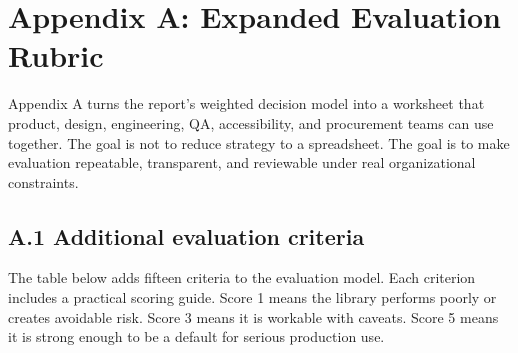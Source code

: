\clearpage
{}
\section*{Appendix A: Expanded Evaluation Rubric}

Appendix A turns the report's weighted decision model into a worksheet that product, design, engineering, QA, accessibility, and procurement teams can use together. The goal is not to reduce strategy to a spreadsheet. The goal is to make evaluation repeatable, transparent, and reviewable under real organizational constraints.

\subsection*{A.1 Additional evaluation criteria}
The table below adds fifteen criteria to the evaluation model. Each criterion includes a practical scoring guide. Score 1 means the library performs poorly or creates avoidable risk. Score 3 means it is workable with caveats. Score 5 means it is strong enough to be a default for serious production use.

